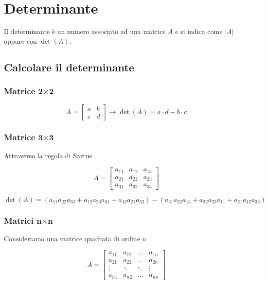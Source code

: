 \section{Determinante}

\begin{definition}
Il determinante è un numero associato ad una matrice $A$ e si indica come $|A|$ oppure con $\det(A)$.
\end{definition}

\subsection{Calcolare il determinante}

\subsubsection{Matrice 2$\times$2}

$$A=\left[\begin{matrix}a & b\\ c & d\end{matrix}\right] \rightarrow \det(A) = a \cdot d - b \cdot c$$

\subsubsection{Matrice 3$\times$3}

Attraverso la regola di Sarrus

$$A=\left[\begin{matrix}a_{11} & a_{12} & a_{13}\\ a_{21} & a_{22} & a_{23}\\ a_{31} & a_{32} & a_{33}\end{matrix}\right]$$

$$\det(A)=(a_{11}a_{22}a_{33}+a_{12}a_{23}a_{31}+a_{13}a_{21}a_{32})-(a_{31}a_{22}a_{13}+a_{32}a_{23}a_{11}+a_{21}a_{12}a_{33})$$

\subsubsection{Matrici n$\times$n}

Consideriamo una matrice quadrata di ordine $n$

$$A=\left[\begin{matrix} a_{11} & a_{12}& \dots& a_{1n} \\ a_{21} & a_{22}& \dots &a_{2n}\\ \vdots & \ddots &\ddots & \vdots\\ a_{n1}& a_{n2} & \dots & a_{nn} \end{matrix}\right]$$

